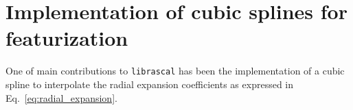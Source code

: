\section{Implementation of cubic splines for featurization}
\label{sec:cubic_spline}
One of main contributions to \texttt{librascal} has been the implementation of a cubic spline to interpolate the radial expansion coefficients as expressed in Eq.~\eqref{eq:radial_expansion}.
